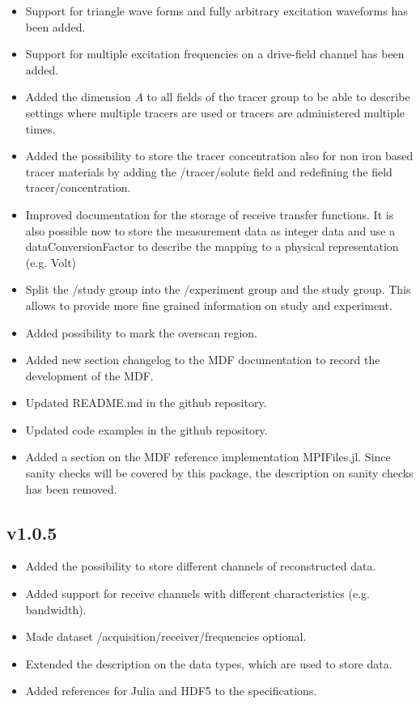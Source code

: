 \documentclass[landscape,a4paper]{article} %
\newcommand{\inlvar}[1]{{\ttfamily#1}}
\begin{document}
\begin{multicols}{2}
\begin{itemize}
	\item Support for triangle wave forms and fully arbitrary excitation waveforms has been added.
	\item Support for multiple excitation frequencies on a drive-field channel has been added.
	\item Added the dimension $A$ to all fields of the \inlvar{tracer} group to be able to describe settings where multiple tracers are used or tracers are administered multiple times.
	\item Added the possibility to store the tracer concentration also for non iron based tracer materials by adding the \inlvar{/tracer/solute} field and redefining the field \inlvar{tracer/concentration}.
 	\item Improved documentation for the storage of receive transfer functions. It is also possible now to store the measurement data as integer data and use a \inlvar{dataConversionFactor} to describe the mapping to a physical representation (e.g. Volt)
	\item Split the \inlvar{/study} group into the \inlvar{/experiment} group and the study group. This allows to provide more fine grained information on study and experiment.
	\item Added possibility to mark the overscan region.
	\item Added new section changelog to the MDF documentation to record the development of the MDF.
	\item Updated \inlvar{README.md} in the github repository.
	\item Updated code examples in the github repository.
	\item Added a section on the MDF reference implementation MPIFiles.jl. Since sanity checks will be covered by this package, the description on sanity checks has been removed.
\end{itemize}


\subsection{v1.0.5}

\begin{itemize}
	\item Added the possibility to store different channels of reconstructed data.
	\item Added support for receive channels with different characteristics (e.g. bandwidth).
	\item Made dataset \inlvar{/acquisition/receiver/frequencies} optional.
	\item Extended the description on the data types, which are used to store data.
	\item Added references for Julia and HDF5 to the specifications.
\end{itemize}



\end{multicols}
\end{document}

